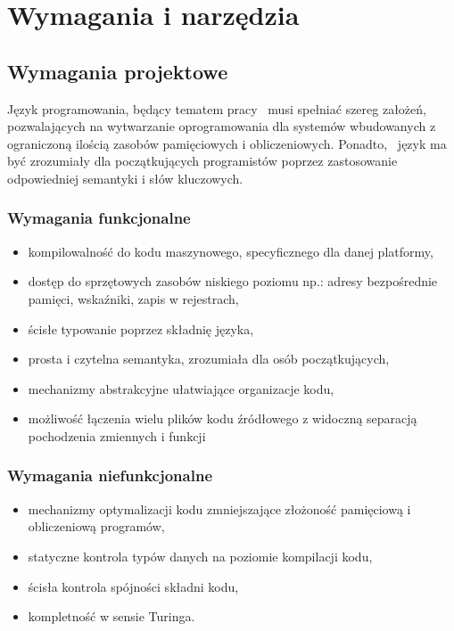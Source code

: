 \chapter{Wymagania i narzędzia}
\label{ch:wymagania-i-narzedzia}

\section{Wymagania projektowe}

Język programowania, będący tematem pracy \comma\ musi spełniać szereg założeń, pozwalających na wytwarzanie oprogramowania dla systemów wbudowanych z ograniczoną ilością zasobów pamięciowych i obliczeniowych. Ponadto, \nocomma\ język ma być zrozumiały dla początkujących programistów poprzez zastosowanie odpowiedniej semantyki i słów kluczowych.

\subsection{Wymagania funkcjonalne}
\begin{itemize}
\item kompilowalność do kodu maszynowego, specyficznego dla danej platformy,
\item dostęp do sprzętowych zasobów niskiego poziomu np.: adresy bezpośrednie pamięci, wskaźniki, zapis w rejestrach,
\item ścisłe typowanie poprzez składnię języka,
\item prosta i czytelna semantyka, zrozumiała dla osób początkujących,
\item mechanizmy abstrakcyjne ułatwiające organizacje kodu,
\item możliwość łączenia wielu plików kodu źródłowego z widoczną separacją pochodzenia zmiennych i funkcji 
\end{itemize}

\subsection{Wymagania niefunkcjonalne}
\begin{itemize}
\item mechanizmy optymalizacji kodu zmniejszające złożoność pamięciową i obliczeniową programów,
\item statyczne kontrola typów danych na poziomie kompilacji kodu,
\item ścisła kontrola spójności składni kodu,
\item kompletność w sensie Turinga.
\end{itemize}

